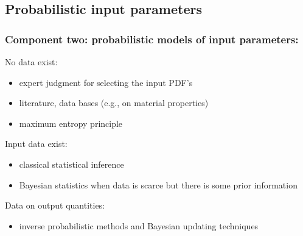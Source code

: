 \begin{frame}

\end{frame}

\subsection{Probabilistic input parameters}
\begin{frame}
	\frametitle{Component two: probabilistic models of input parameters:}

 \begin{block}{No data exist:}
\begin{itemize}
    \item \alert{expert judgment} for selecting the input PDF's
    \item literature, data bases (e.g., on material properties)
    \item maximum entropy principle
\end{itemize}
 \end{block}

\begin{block}{Input data exist:}
\begin{itemize}
    \item classical statistical inference
    \item \alert{Bayesian statistics} when data is scarce but there is some prior information
\end{itemize}
 \end{block}

 \begin{block}{Data on output quantities:}
\begin{itemize}
    \item \alert{inverse} probabilistic methods and \alert{Bayesian updating} techniques 
\end{itemize}
 \end{block}
 
 \end{frame}
 

